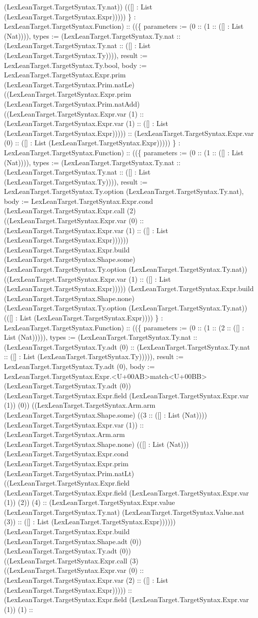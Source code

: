 \documentclass[11pt]{article}
\begin{document}
(LexLeanTarget.TargetSyntax.Ty.nat)) (([] : List (LexLeanTarget.TargetSyntax.Expr))))) \} : LexLeanTarget.TargetSyntax.Function) :: ((\{ parameters := (0 :: (1 :: ([] : List (Nat)))), types := (LexLeanTarget.TargetSyntax.Ty.nat :: (LexLeanTarget.TargetSyntax.Ty.nat :: ([] : List (LexLeanTarget.TargetSyntax.Ty)))), result := LexLeanTarget.TargetSyntax.Ty.bool, body := LexLeanTarget.TargetSyntax.Expr.prim (LexLeanTarget.TargetSyntax.Prim.natLe) ((LexLeanTarget.TargetSyntax.Expr.prim (LexLeanTarget.TargetSyntax.Prim.natAdd) ((LexLeanTarget.TargetSyntax.Expr.var (1) :: (LexLeanTarget.TargetSyntax.Expr.var (1) :: ([] : List (LexLeanTarget.TargetSyntax.Expr))))) :: (LexLeanTarget.TargetSyntax.Expr.var (0) :: ([] : List (LexLeanTarget.TargetSyntax.Expr))))) \} : LexLeanTarget.TargetSyntax.Function) :: ((\{ parameters := (0 :: (1 :: ([] : List (Nat)))), types := (LexLeanTarget.TargetSyntax.Ty.nat :: (LexLeanTarget.TargetSyntax.Ty.nat :: ([] : List (LexLeanTarget.TargetSyntax.Ty)))), result := LexLeanTarget.TargetSyntax.Ty.option (LexLeanTarget.TargetSyntax.Ty.nat), body := LexLeanTarget.TargetSyntax.Expr.cond (LexLeanTarget.TargetSyntax.Expr.call (2) ((LexLeanTarget.TargetSyntax.Expr.var (0) :: (LexLeanTarget.TargetSyntax.Expr.var (1) :: ([] : List (LexLeanTarget.TargetSyntax.Expr)))))) (LexLeanTarget.TargetSyntax.Expr.build (LexLeanTarget.TargetSyntax.Shape.some) (LexLeanTarget.TargetSyntax.Ty.option (LexLeanTarget.TargetSyntax.Ty.nat)) ((LexLeanTarget.TargetSyntax.Expr.var (1) :: ([] : List (LexLeanTarget.TargetSyntax.Expr))))) (LexLeanTarget.TargetSyntax.Expr.build (LexLeanTarget.TargetSyntax.Shape.none) (LexLeanTarget.TargetSyntax.Ty.option (LexLeanTarget.TargetSyntax.Ty.nat)) (([] : List (LexLeanTarget.TargetSyntax.Expr)))) \} : LexLeanTarget.TargetSyntax.Function) :: ((\{ parameters := (0 :: (1 :: (2 :: ([] : List (Nat))))), types := (LexLeanTarget.TargetSyntax.Ty.nat :: (LexLeanTarget.TargetSyntax.Ty.adt (0) :: (LexLeanTarget.TargetSyntax.Ty.nat :: ([] : List (LexLeanTarget.TargetSyntax.Ty))))), result := LexLeanTarget.TargetSyntax.Ty.adt (0), body := LexLeanTarget.TargetSyntax.Expr.<U+00AB>match<U+00BB> (LexLeanTarget.TargetSyntax.Ty.adt (0)) (LexLeanTarget.TargetSyntax.Expr.field (LexLeanTarget.TargetSyntax.Expr.var (1)) (0)) ((LexLeanTarget.TargetSyntax.Arm.arm (LexLeanTarget.TargetSyntax.Shape.some) ((3 :: ([] : List (Nat)))) (LexLeanTarget.TargetSyntax.Expr.var (1)) :: (LexLeanTarget.TargetSyntax.Arm.arm (LexLeanTarget.TargetSyntax.Shape.none) (([] : List (Nat))) (LexLeanTarget.TargetSyntax.Expr.cond (LexLeanTarget.TargetSyntax.Expr.prim (LexLeanTarget.TargetSyntax.Prim.natLt) ((LexLeanTarget.TargetSyntax.Expr.field (LexLeanTarget.TargetSyntax.Expr.field (LexLeanTarget.TargetSyntax.Expr.var (1)) (2)) (4) :: (LexLeanTarget.TargetSyntax.Expr.value (LexLeanTarget.TargetSyntax.Ty.nat) (LexLeanTarget.TargetSyntax.Value.nat (3)) :: ([] : List (LexLeanTarget.TargetSyntax.Expr)))))) (LexLeanTarget.TargetSyntax.Expr.build (LexLeanTarget.TargetSyntax.Shape.adt (0)) (LexLeanTarget.TargetSyntax.Ty.adt (0)) ((LexLeanTarget.TargetSyntax.Expr.call (3) ((LexLeanTarget.TargetSyntax.Expr.var (0) :: (LexLeanTarget.TargetSyntax.Expr.var (2) :: ([] : List (LexLeanTarget.TargetSyntax.Expr))))) :: (LexLeanTarget.TargetSyntax.Expr.field (LexLeanTarget.TargetSyntax.Expr.var (1)) (1) :: 
\end{document}
